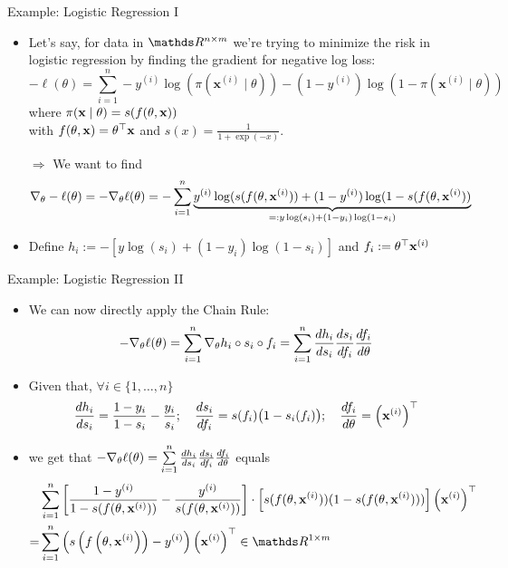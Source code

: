 \documentclass[11pt,compress,t,notes=noshow, xcolor=table]{beamer}
\newcommand{\deriv}{d}
\begin{document}
\begin{vbframe}{Example: Logistic Regression I}
\begin{itemize}    \setlength{\itemsep}{0.5\baselineskip}
    \item Let's say, for data in $\R^{n\times m}$ we're trying to minimize the risk in logistic regression by finding the gradient for negative log loss:
\[
-\ell({\theta})=\sum_{i=1}^n-y^{(i)} \log \left(\pi\left(\mathbf{x}^{(i)} \mid \theta\right)\right)-\left(1-y^{(i)}\right) \log \left(1-\pi\left(\mathbf{x}^{(i)} \mid \theta\right)\right)
\]
where $
\pi(\mathbf{x} \mid {\theta})=s(f(\theta,\mathbf{x}))
$\\[5pt] with 
$f(\theta,\mathbf{x})=\theta^{\top} \mathbf{x}$ and $s(x)=\frac{1}{1+\exp (-x)}$.
\item[$\Rightarrow$] We want to find \begin{align*}
\nabla_\theta -\ell (\theta)=-\nabla_\theta \ell (\theta)&=-\sum\limits_{i=1}^n\underbrace{ y^{(i)} \log (s(f(\theta,\mathbf{x}^{(i)}))+(1-y^{(i)}) \log (1-s(f(\theta,\mathbf{x}^{(i)}))}_{=:y \log (s_i)+(1-y_i) \log (1-s_i)}
\end{align*}
\item Define $h_i:=-[y \log (s_i)+(1-y_i) \log (1-s_i)]$  and $f_i:=\theta^{\top} \mathbf{x}^{(i)}$
\end{itemize}
\end{vbframe}

\begin{vbframe}{Example: Logistic Regression II}
\begin{itemize}    \setlength{\itemsep}{0.5\baselineskip}
\item We can now directly apply the Chain Rule:
$$
-\nabla_\theta \ell (\theta)=\sumin\nabla_\theta h_i\circ s_i \circ f_i=\sumin\frac{\deriv h_i}{\deriv s_i} \frac{\deriv s_i}{\deriv f_i} \frac{\deriv f_i}{\deriv \theta}
$$
    \item Given that, $\forall i\in\{1,\dots,n\}$ $$\frac{\deriv h_i}{\deriv s_i}=\frac{1-y_i}{1-s_i}-\frac{y_i}{s_i};\quad\frac{\deriv s_i}{\deriv f_i}=s(f_i)\big(1-s_i(f_i)\big);\quad\frac{\deriv f_i}{\deriv \theta}=\left(\xv^{(i)}\right)^\top$$
    \item we get that $-\nabla_\theta \ell (\theta)=\sumin\frac{\deriv h_i}{\deriv s_i} \frac{\deriv s_i}{\deriv f_i} \frac{\deriv f_i}{\deriv \theta}$  equals\begin{align*}
        &\sumin \left[\frac{1-y^{(i)}}{1-s(f(\theta, \xv^{(i)}))}-\frac{y^{(i)}}{s(f(\theta, \xv^{(i)}))}\right] \cdot \left[s(f(\theta, \xv^{(i)}))(1-s(f(\theta, \xv^{(i)})))\right] \left(\xv^{(i)}\right)^\top\\
        =&\sumin\left(s\left(f\left(\theta,\xv^{(i)}\right)\right)-y^{(i)}\right)\left(\xv^{(i)}\right)^\top\in\R^{1\times m}
    \end{align*}
\end{itemize}
\end{vbframe}
\end{document}
